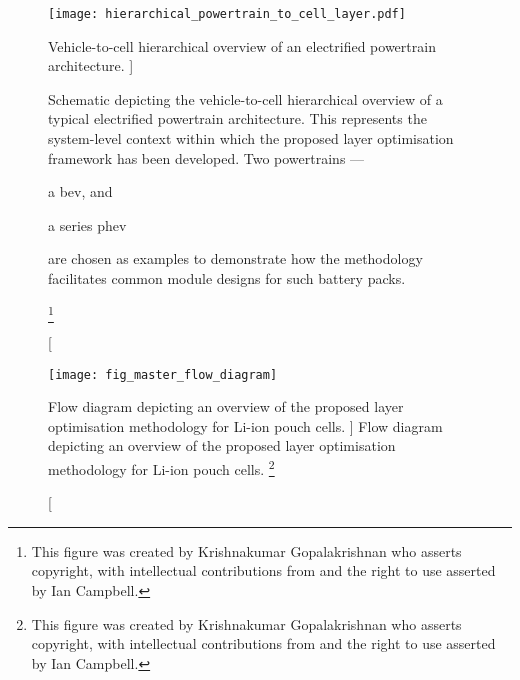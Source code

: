 \begin{figure}[!bp]
    \begin{minipage}[t]{\textwidth}
        \centering
        \texttt{[image: hierarchical\_powertrain\_to\_cell\_layer.pdf]}
        \caption
        [%
        Vehicle-to-cell hierarchical  overview of  an electrified powertrain architecture.
        ]%
        {%
            Schematic  depicting   the  vehicle-to-cell  hierarchical   overview  of
            a  typical   electrified  powertrain   architecture.  This   represents  the
            system-level context within which  the proposed layer optimisation framework
            has been developed. Two  powertrains ---
            \begin{enumerate*}[label=\itshape\alph*\upshape)]
                \item  a \gls{bev}, and
                \item  a series \gls{phev}
            \end{enumerate*}
            are  chosen as  examples  to demonstrate  how  the methodology  facilitates
            common module designs for such battery packs\footnotemark.
        }%
        \label{fig:fig_PowertrainSchematic}
        \mpfootnotes[1]
        \footnote{This  figure was  created by  Krishnakumar Gopalakrishnan  who
            asserts copyright, with intellectual contributions from and the right to
        use asserted by Ian Campbell.}
    \end{minipage}
\end{figure}

\begin{figure}[p]
    \begin{minipage}[t]{\textwidth}
        \centering
        \texttt{[image: fig\_master\_flow\_diagram]}
        \caption
        [%
        Flow diagram depicting an overview  of the proposed layer optimisation methodology
        for Li-ion pouch cells.
        ]%
        {%
            Flow diagram depicting an overview  of the proposed layer optimisation methodology
            for Li-ion pouch cells\footnotemark.
        }%
        \label{fig:fig_strategy_schematic}
        \mpfootnotes[1]
        \vspace*{0.7225cm}
        \footnote{This  figure was  created by  Krishnakumar Gopalakrishnan  who
            asserts copyright, with intellectual contributions from and the right to
        use asserted by Ian Campbell.}
    \end{minipage}
\end{figure}

